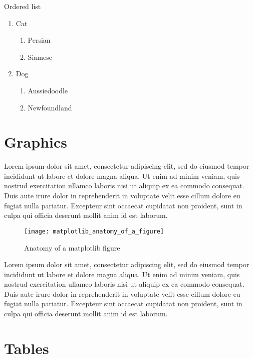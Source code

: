 \documentclass[10pt, letterpaper, twoside]{article}
\theoremstyle{myenv}
\theoremstyle{mytheorem}
\theoremstyle{mydefinition}
\begin{document}
Ordered list
\begin{enumerate}
    \item Cat
        \begin{enumerate}
            \item Persian
            \item Siamese
        \end{enumerate}
    \item Dog
        \begin{enumerate}
            \item Aussiedoodle
            \item Newfoundland
        \end{enumerate}
\end{enumerate}

\newpage
\section{Graphics}
\label{sec:graphics}
Lorem ipsum dolor sit amet, consectetur adipiscing elit, sed do eiusmod tempor incididunt ut labore et dolore magna aliqua. Ut enim ad minim veniam, quis nostrud exercitation ullamco laboris nisi ut aliquip ex ea commodo consequat. Duis aute irure dolor in reprehenderit in voluptate velit esse cillum dolore eu fugiat nulla pariatur. Excepteur sint occaecat cupidatat non proident, sunt in culpa qui officia deserunt mollit anim id est laborum.

\begin{figure}[H]
\texttt{[image: matplotlib\_anatomy\_of\_a\_figure]}
\caption{Anatomy of a matplotlib figure}
\end{figure}
\label{fig:anatomy_of_a_matplotlib_figure}

Lorem ipsum dolor sit amet, consectetur adipiscing elit, sed do eiusmod tempor incididunt ut labore et dolore magna aliqua. Ut enim ad minim veniam, quis nostrud exercitation ullamco laboris nisi ut aliquip ex ea commodo consequat. Duis aute irure dolor in reprehenderit in voluptate velit esse cillum dolore eu fugiat nulla pariatur. Excepteur sint occaecat cupidatat non proident, sunt in culpa qui officia deserunt mollit anim id est laborum.

\newpage
\section{Tables}
\label{sec:tables}
\end{document}
